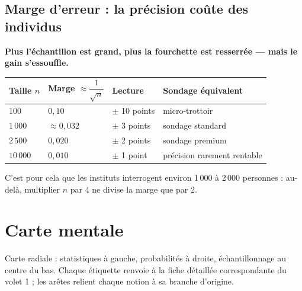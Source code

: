 \documentclass[11pt,a4paper]{article}
\begin{document}
	\subsection{Marge d'erreur : la précision coûte des individus}
	
	\begin{center}
		\sffamily\bfseries Plus l'échantillon est grand, plus la fourchette est
		resserrée — mais le gain s'essouffle.\\[6pt]
		\begin{tabular}{llll}
			\toprule
			\textbf{Taille $n$} & \textbf{Marge $\approx \dfrac{1}{\sqrt{n}}$} &
			\textbf{Lecture} & \textbf{Sondage équivalent} \\
			\midrule
			$100$ & $0{,}10$ & $\pm$ 10 points & micro-trottoir \\
			$1\,000$ & $\approx 0{,}032$ & $\pm$ 3 points & sondage standard \\
			$2\,500$ & $0{,}020$ & $\pm$ 2 points & sondage premium \\
			$10\,000$ & $0{,}010$ & $\pm$ 1 point & précision rarement rentable \\
			\bottomrule
		\end{tabular}
	\end{center}
	
	C'est pour cela que les instituts interrogent environ 1\,000 à 2\,000
	personnes : au-delà, multiplier $n$ par 4 ne divise la marge que par 2.
	
	\section{Carte mentale}
	
	Carte radiale : statistiques à gauche, probabilités à droite,
	échantillonnage au centre du bas. Chaque étiquette renvoie à la fiche
	détaillée correspondante du volet 1 ; les arêtes relient chaque notion à sa
	branche d'origine.
	
\end{document}
